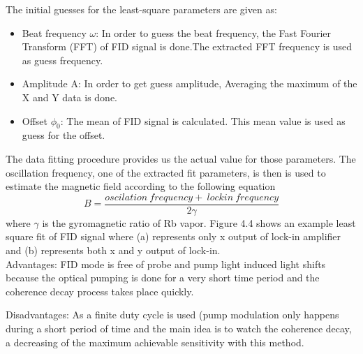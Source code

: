 \documentclass[12pt]{report}
\begin{document}
\begin{itemize}
The initial guesses for the least-square parameters are given
as:
\begin{itemize}
\item
Beat frequency $\omega$: In order to guess the beat frequency, the Fast Fourier Transform (FFT) of FID signal is done.The extracted FFT frequency is used as guess frequency.
\item
Amplitude A: In order to get guess amplitude, Averaging the maximum of the X and Y data is done.
\item
Offset $\phi_0$: The mean of FID signal is calculated. This mean value is used as guess for the offset. 

\end{itemize}
The data fitting procedure provides us the actual value for those parameters. The oscillation frequency, one of the extracted fit parameters, is then is used to estimate the magnetic field according to the following equation
\begin{equation}
B= \frac{oscilation ~ frequency +~lock in~ frequency}{2\gamma}
\end{equation}
where $\gamma$ is the gyromagnetic ratio of Rb vapor. Figure 4.4 shows an example least square fit of FID signal where (a) represents only x output of lock-in amplifier and (b) represents both x and y output of lock-in.\\
Advantages: FID mode is free of probe and pump light induced light shifts because the optical pumping is done for a very short time period and the coherence decay process takes place quickly. 

Disadvantages: As a finite duty cycle is used (pump modulation only happens during a short period of time and the main idea is to watch the coherence decay, a decreasing of the maximum achievable sensitivity with this method.


\end{itemize}
\end{document}
